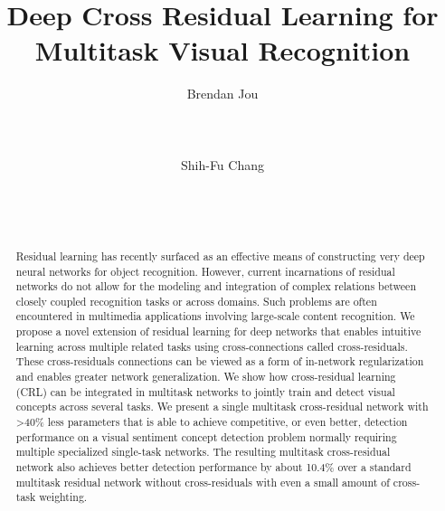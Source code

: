 \documentclass{sig-alternate-05-2015}
\begin{document}
\isbn{}\acmPrice{}


\title{Deep Cross Residual Learning for\\Multitask Visual Recognition}
\subtitle{}

\author{
\alignauthor
Brendan Jou\\
       \\
       \\
       \\
\alignauthor Shih-Fu Chang\\
       \\
       \\
       \\
}

\date{}

\maketitle

\begin{abstract}
Residual learning has recently surfaced as an effective means of constructing very deep neural networks for object recognition.
However, current incarnations of residual networks do not allow for the modeling and integration of complex relations between closely coupled recognition tasks or across domains.
Such problems are often encountered in multimedia applications involving large-scale content recognition.
We propose a novel extension of residual learning for deep networks that enables intuitive learning across multiple related tasks using cross-connections called cross-residuals.
These cross-residuals connections can be viewed as a form of in-network regularization and enables greater network generalization.
We show how cross-residual learning (CRL) can be integrated in multitask networks to jointly train and detect visual concepts across several tasks.
We present a single multitask cross-residual network with >40\% less parameters that is able to achieve competitive, or even better, detection performance on a visual sentiment concept detection problem normally requiring multiple specialized single-task networks.
The resulting multitask cross-residual network also achieves better detection performance by about 10.4\% over a standard multitask residual network without cross-residuals with even a small amount of cross-task weighting.
\end{abstract}
\end{document}
